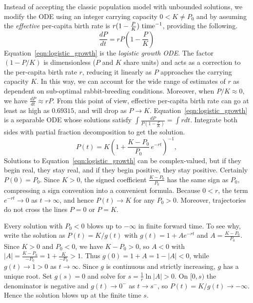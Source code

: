 \begin{example}
Instead of accepting the classic population model with unbounded solutions, we modify the ODE using an integer carrying capacity $0 < K \neq P_0$ and by assuming the \textit{effective} per-capita birth rate is $r(1-\frac{P}{K})\textup{ time}^{-1}$, providing the following.
\begin{equation}\label{eqn:logistic_growth}
\frac{dP}{dt} = r P\left(1-\frac{P}{K}\right)
\end{equation}
Equation~\ref{eqn:logistic_growth} is the \textit{logistic growth ODE}.
The factor $(1 - P/K)$ is dimensionless ($P$ and $K$ share units) and acts as a correction to the per-capita birth rate $r$, reducing it linearly as $P$ approaches the carrying capacity $K$. In this way, we can account for the wide range of estimates of $r$ as dependent on sub-optimal rabbit-breeding conditions. Moreover, when $P/K \approx 0$, we have $\frac{dP}{dt} \approx rP$. From this point of view, effective per-capita birth rate can go at least as high as $0.69315$, and will drop as $P \to K$.
Equation~\ref{eqn:logistic_growth} is a separable ODE whose solutions satisfy $\int \frac{dP}{P(1-\frac{P}{K})} = \int r dt$.
Integrate both sides with partial fraction decomposition to get the solution.
\begin{equation}\label{eqn:logistic_solution}
P(t) = K\left(1 + \frac{K-P_0}{P_0}\,e^{-rt}\right)^{-1},
\end{equation}
Solutions to Equation~\ref{eqn:logistic_growth} can be complex-valued, but if they begin real, they stay real, and if they begin positive, they stay positive.  Certainly $P(0) = P_0$. Since $K > 0$, the signed coefficient $\frac{K-P_0}{P_0}$ has the same sign as $P_0$, compressing a sign convention into a convenient formula. Because $0 < r$, the term $e^{-rt} \to 0$ as $t \to \infty$, and hence $P(t) \to K$ for any $P_0 > 0$. Moreover, trajectories do not cross the lines $P = 0$ or $P = K$.

Every solution with $P_0 < 0$ blows up to $-\infty$ in finite forward time. To see why, write the solution as $P(t)=K/g(t)$ with $g(t)=1+A e^{-rt}$ and $A=\frac{K-P_0}{P_0}$.  Since $K>0$ and $P_0<0$, we have $K-P_0>0$, so $A<0$ with $|A|=\frac{K-P_0}{-P_0}=1+\frac{K}{-P_0} > 1$. Thus $g(0)=1+A=1-|A|<0$, while $g(t)\to 1>0$ as $t\to\infty$. Since $g$ is continuous and strictly increasing, $g$ has a unique root. Set $g(s) = 0$ and solve for $s=\frac{1}{r}\ln|A|>0$. On $[0,s)$ the denominator is negative and $g(t)\to 0^{-}$ as $t\to s^{-}$, so $P(t)=K/g(t)\to-\infty$. Hence the solution blows up at the finite time $s$.


\end{example}
